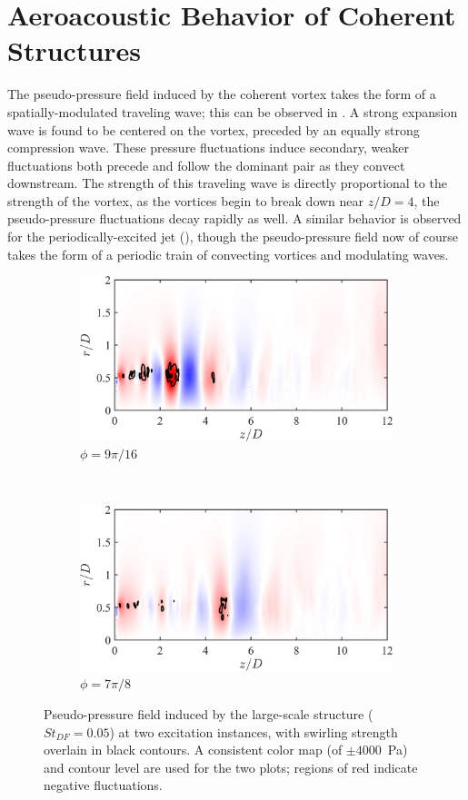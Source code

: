 \section{Aeroacoustic Behavior of Coherent Structures}
The pseudo-pressure field induced by the coherent vortex takes the form of a spatially-modulated traveling wave; this can be observed in .
A strong expansion wave is found to be centered on the vortex, preceded by an equally strong compression wave.
These pressure fluctuations induce secondary, weaker fluctuations both precede and follow the dominant pair as they convect downstream.
The strength of this traveling wave is directly proportional to the strength of the vortex, as the vortices begin to break down near $z/D = 4$, the pseudo-pressure fluctuations decay rapidly as well. 
A similar behavior is observed for the periodically-excited jet (), though the pseudo-pressure field now of course takes the form of a periodic train of convecting vortices and modulating waves.
\begin{figure}
	\centering
	\begin{subfigure}{0.75\textwidth}
		\centering
		\includegraphics[width=0.95\linewidth]{Figures/ch5_St005_PSL_101.png}
		\caption{$\phi = 9 \pi /16$}
	\end{subfigure}\\
	\begin{subfigure}{0.75\textwidth}
		\centering
		\includegraphics[width=0.95\linewidth]{Figures/ch5_St005_PSL_161.png}
		\caption{$\phi = 7 \pi /8$}
	\end{subfigure}
	\caption{Pseudo-pressure field induced by the large-scale structure ($St_{DF} = 0.05$) at two excitation instances, with swirling strength overlain in black contours. A consistent color map (of $\pm 4000$~Pa) and contour level are used for the two plots; regions of red indicate negative fluctuations.}
	\label{fig:PSL_St005}
\end{figure}
